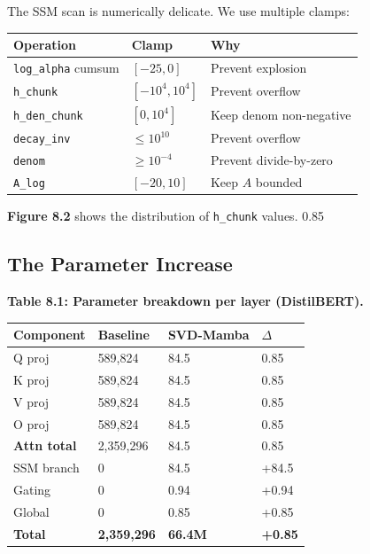 The SSM scan is numerically delicate. We use multiple clamps:

\begin{table}[H]
\centering
\small
\begin{tabular}{lll}
\toprule
\textbf{Operation} & \textbf{Clamp} & \textbf{Why} \\
\midrule
\texttt{log\_alpha} cumsum & $[-25, 0]$ & Prevent explosion \\
\texttt{h\_chunk} & $[-10^4, 10^4]$ & Prevent overflow \\
\texttt{h\_den\_chunk} & $[0, 10^4]$ & Keep denom non-negative \\
\texttt{decay\_inv} & $\leq 10^{10}$ & Prevent overflow \\
\texttt{denom} & $\geq 10^{-4}$ & Prevent divide-by-zero \\
\texttt{A\_log} & $[-20, 10]$ & Keep $A$ bounded \\
\bottomrule
\end{tabular}
\end{table}

\textbf{Figure 8.2} shows the distribution of \texttt{h\_chunk} values. 0.85

\subsection{The Parameter Increase}

\textbf{Table 8.1: Parameter breakdown per layer (DistilBERT).}

\begin{table}[H]
\centering
\small
\begin{tabular}{llll}
\toprule
\textbf{Component} & \textbf{Baseline} & \textbf{SVD-Mamba} & \textbf{$\Delta$} \\
\midrule
Q proj & 589,824 & 84.5 & 0.85 \\
K proj & 589,824 & 84.5 & 0.85 \\
V proj & 589,824 & 84.5 & 0.85 \\
O proj & 589,824 & 84.5 & 0.85 \\
\textbf{Attn total} & 2,359,296 & 84.5 & 0.85 \\
SSM branch & 0 & 84.5 & +84.5 \\
Gating & 0 & 0.94 & +0.94 \\
Global & 0 & 0.85 & +0.85 \\
\textbf{Total} & \textbf{2,359,296} & \textbf{66.4M} & \textbf{+0.85} \\
\bottomrule
\end{tabular}
\end{table}

